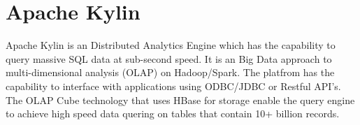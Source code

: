 \section{Apache Kylin}

Apache Kylin is an Distributed Analytics Engine which has the capability to
query massive SQL data at sub-second speed. It is an Big Data approach to
multi-dimensional analysis (OLAP) on Hadoop/Spark. The platfrom has the
capability to interface with applications using ODBC/JDBC or Restful API's.
The OLAP Cube technology that uses HBase for storage enable the query engine
to achieve high speed data quering on tables that contain 10+ billion records.
